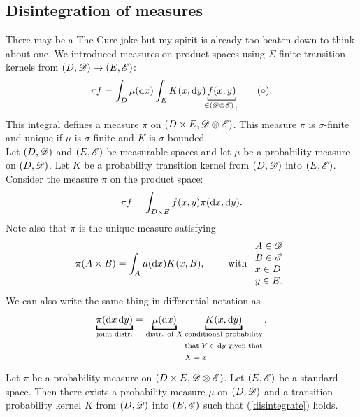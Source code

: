 \documentclass{report}
\begin{document}
 \subsection{Disintegration of measures}
 There may be a The Cure joke but my spirit is already too beaten down to think about one. We introduced measures on product spaces using $\Sigma$-finite transition kernels from $(D,\mathscr{D})\to(E,\mathscr{E})$:
 \begin{equation}
 	\pi f=\int_D\mu(\dx)\int_E K(x,\dy)\underbracket[0.6pt]{f(x,y)}_{\mathclap{\in\left(\D\otimes\E\right)_{+}}}\tag{$\circ$}\label{disintegrate}.
\end{equation}
 This integral defines a measure $\pi$ on $(D\times E,\mathscr{D}\otimes\mathscr{E})$. This measure $\pi$ is $\sigma$-finite and unique if $\mu$ is $\sigma$-finite and $K$ is $\sigma$-bounded.\\
 Let $(D,\mathscr{D})$ and $(E,\mathscr{E})$ be measurable spaces and let $\mu$ be a probability measure on $(D,\mathscr{D})$. Let $K$ be a probability transition kernel from $(D,\mathscr{D})$ into $(E,\mathscr{E})$. Consider the measure $\pi$ on the product space:
 \begin{equation*}
 	\pi f=\int_{D\times E}f(x,y)\pi(\mathop{}\!\mathrm{d} x,\mathop{}\!\mathrm{d} y).
 \end{equation*}
 Note also that $\pi$ is the unique measure satisfying 
 \begin{equation*}
 	\pi(A\times B)=\int_A\mu(\mathop{}\!\mathrm{d} x)K(x,B),\qquad\text{ with }\begin{array}{l}
 		A\in\mathscr{D}\\
 		B\in\mathscr{E}\\
 		x\in D\\
 		y\in E.
 	\end{array}
 \end{equation*}
 We can also write the same thing in differential notation as
 \begin{equation*}
 	\underbracket{\pi(\dx\dy)}_{\text{joint distr.}}=\underbracket{\mu(\dx)}_{\text{distr. of }X}\underbracket{K(x,\dy)}_{\text{\parbox{10em}{conditional probability that $Y\in\dy$ given that $X=x$}}}.
 \end{equation*}
 \begin{theorem}
Let $\pi$ be a probability measure on $(D\times E,\mathscr{D}\otimes\mathscr{E})$. Let $(E,\mathscr{E})$ be a standard space. Then there exists a probability measure $\mu$ on $(D,\mathscr{D})$ and a transition probability kernel $K$ from $(D,\mathscr{D})$ into $(E,\mathscr{E})$ such that (\ref{disintegrate}) holds.
\end{theorem}
\end{document}
